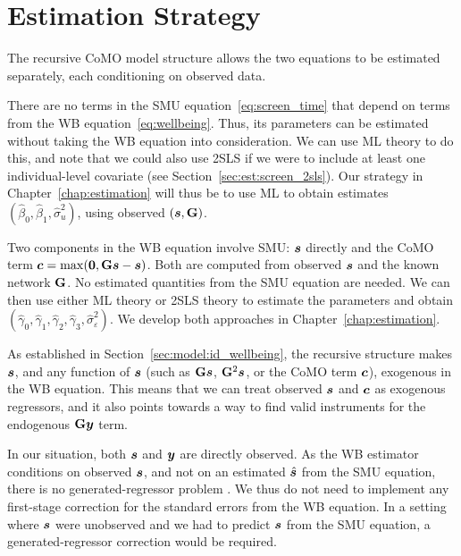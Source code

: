 \section{Estimation Strategy}
\label{sec:model:estimation_strategy}
The recursive CoMO model structure allows the two equations to be estimated separately, each conditioning on observed data.

There are no terms in the SMU equation~\eqref{eq:screen_time} that depend on terms from the WB equation~\eqref{eq:wellbeing}. Thus, its parameters can be estimated without taking the WB equation into consideration. We can use ML theory to do this, and note that we could also use 2SLS if we were to include at least one individual-level covariate (see Section~\ref{sec:est:screen_2sls}). Our strategy in Chapter~\ref{chap:estimation} will thus be to use ML to obtain estimates $(\hat\beta_0, \hat\beta_1, \hat\sigma_u^2)$, using observed $(\bm{s}, \mathbf{G})$.

Two components in the WB equation involve SMU: $\bm{s}$ directly and the CoMO term $\bm{c} = \max(\bm{0}, \mathbf{G}\bm{s} - \bm{s})$. Both are computed from observed $\bm{s}$ and the known network $\mathbf{G}$. No estimated quantities from the SMU equation are needed. We can then use either ML theory or 2SLS theory to estimate the parameters and obtain $(\hat\gamma_0, \hat\gamma_1, \hat\gamma_2, \hat\gamma_3, \hat\sigma_\varepsilon^2)$. We develop both approaches in Chapter~\ref{chap:estimation}.

As established in Section~\ref{sec:model:id_wellbeing}, the recursive structure makes $\bm{s}$, and any function of $\bm{s}$ (such as $\mathbf{G}\bm{s}$, $\mathbf{G}^2\bm{s}$, or the CoMO term $\bm{c}$), exogenous in the WB equation. This means that we can treat observed $\bm{s}$ and $\bm{c}$ as exogenous regressors, and it also points towards a way to find valid instruments for the endogenous $\mathbf{G}\bm{y}$ term.

\begin{remark}
\label{rem:generated_regressor}
In our situation, both $\bm{s}$ and $\bm{y}$ are directly observed. As the WB estimator conditions on observed $\bm{s}$, and not on an estimated $\hat{\bm{s}}$ from the SMU equation, there is no generated-regressor problem \parencite{Pagan1984}. We thus do not need to implement any first-stage correction for the standard errors from the WB equation. In a setting where $\bm{s}$ were unobserved and we had to predict $\bm{s}$ from the SMU equation, a generated-regressor correction would be required.
\end{remark}

